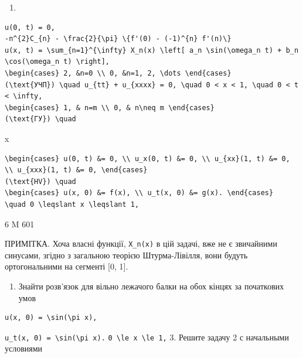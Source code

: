 \documentclass[
  ukrainian,
]{article}
\providecommand{\tightlist}{%
  \setlength{\itemsep}{0pt}\setlength{\parskip}{0pt}}
\begin{document}
\begin{enumerate}
\def\labelenumi{\arabic{enumi}.}
\tightlist
\item
\end{enumerate}

\begin{verbatim}
u(0, t) = 0,
-n^{2}C_{n} - \frac{2}{\pi} \{f'(0) - (-1)^{n} f'(n)\}
u(x, t) = \sum_{n=1}^{\infty} X_n(x) \left[ a_n \sin(\omega_n t) + b_n \cos(\omega_n t) \right],
\begin{cases} 2, &n=0 \\ 0, &n=1, 2, \dots \end{cases}
(\text{УЧП}) \quad u_{tt} + u_{xxxx} = 0, \quad 0 < x < 1, \quad 0 < t < \infty,
\begin{cases} 1, & n=m \\ 0, & n\neq m \end{cases}
(\text{ГУ}) \quad
\end{verbatim}

x

\begin{verbatim}
\begin{cases} u(0, t) &= 0, \\ u_x(0, t) &= 0, \\ u_{xx}(1, t) &= 0, \\ u_{xxx}(1, t) &= 0, \end{cases}
(\text{HV}) \quad
\begin{cases} u(x, 0) &= f(x), \\ u_t(x, 0) &= g(x). \end{cases}
\quad 0 \leqslant x \leqslant 1,
\end{verbatim}

6 M 601

ПРИМІТКА. Хоча власні функції, \texttt{X\_n(x)} в цій задачі, вже не є
звичайними синусами, згідно з загальною теорією Штурма-Лівілля, вони
будуть ортогональними на сегменті {[}0, 1{]}.

\begin{enumerate}
\def\labelenumi{\arabic{enumi}.}
\setcounter{enumi}{1}
\tightlist
\item
  Знайти розв'язок для вільно лежачого балки на обох кінцях за
  початкових умов
\end{enumerate}

\begin{verbatim}
u(x, 0) = \sin(\pi x),
\end{verbatim}

\texttt{u\_t(x,\ 0)\ =\ \textbackslash{}sin(\textbackslash{}pi\ x).}
\texttt{0\ \textbackslash{}le\ x\ \textbackslash{}le\ 1,} 3. Решите
задачу 2 с начальными условиями
\end{document}
